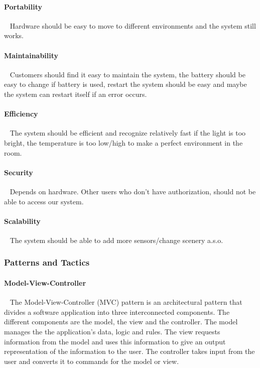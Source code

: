 \documentclass[../document]{subfiles}
\begin{document}
\paragraph{Portability} \ \newline
Hardware should be easy to move to different environments and the system still works.

\paragraph{Maintainability} \ \newline
Customers should find it easy to maintain the system, the battery should be easy to change if battery is used, restart the system should be easy and maybe the system can restart itself if an error occurs. 

\paragraph{Efficiency} \ \newline
The system should be efficient and recognize relatively fast if the light is too bright, the temperature is too low/high to make a perfect environment in the room. 

\paragraph{Security} \ \newline
Depends on hardware. Other users who don't have authorization, should not be able to access our system.

\paragraph{Scalability} \ \newline
The system should be able to add more sensors/change scenery a.s.o.  

\subsubsection{Patterns and Tactics}
\paragraph{Model-View-Controller}  \ \newline
The Model-View-Controller (MVC) pattern is an architectural pattern that divides a software application into three interconnected components. The different components are the model, the view and the controller. The model manages the the application’s data, logic and rules. The view requests information from the model and uses this information to give an output representation of the information to the user. The controller takes input from the user and converts it to commands for the model or view. 
\end{document}

